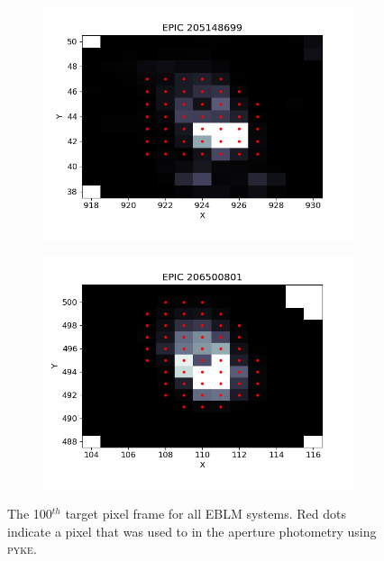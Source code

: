 \begin{figure}
  \begin{subfigure}[b]{0.5\linewidth}
    \centering
    \includegraphics[width=\linewidth]{6-images/EPIC205148699_PIXEL_FILE.png} 
    \label{EPIC205148699_PIXEL_FILE} 
  \end{subfigure}%
  \begin{subfigure}[b]{0.5\linewidth}
    \centering
   \includegraphics[width=\linewidth]{6-images/EPIC206500801_PIXEL_FILE.png}
    \label{EPIC206500801_PIXEL_FILE} 
  \end{subfigure} 
  \caption{The 100$^{th}$ target pixel frame for all EBLM systems. Red dots indicate a pixel that was used to in the aperture photometry using \textsc{pyke}. }
  \label{observations:target_pixel_files}   
\end{figure}


